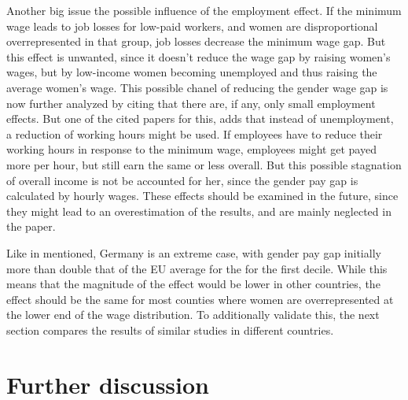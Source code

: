 \documentclass[12pt,draft,a4paper]{article}
\begin{document}
Another big issue the possible influence of the employment effect. 
If the minimum wage leads to job losses for low-paid workers, and women are disproportional overrepresented in that group, job losses decrease the minimum wage gap. But this effect is unwanted, since it doesn't reduce the wage gap by raising women's wages, but by low-income women becoming unemployed and thus raising the average women's wage. 
This possible chanel of reducing the gender wage gap is now further analyzed by \citet{CALIENDO22} citing that there are, if any, only small employment effects. But one of the cited papers for this, \citep{Caliendo2017short} adds that instead of unemployment, a reduction of working hours might be used.
If employees have to reduce their working hours in response to the minimum wage, employees might get payed more per hour, but still earn the same or less overall.
But this possible stagnation of overall income is not be accounted for her, since the gender pay gap is calculated by hourly wages.
These effects should be examined in the future, since they might lead to an overestimation of the results, and are mainly neglected in the paper.


Like in  mentioned, Germany is an extreme case, with gender pay gap initially more than double that of the EU average for the for the first decile. While this means that the magnitude of the effect would be lower in other countries, the effect should be the same for most counties where women are overrepresented at the lower end of the wage distribution. To additionally validate this, the next section compares the results of similar studies in different countries.


\section{Further discussion} %
\end{document}
